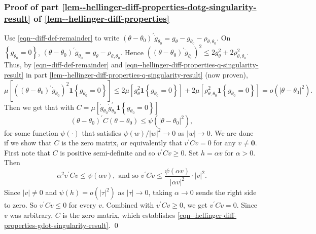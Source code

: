 \documentclass[12pt]{article}
\let\Cref\autoref
\theoremstyle{definition}
\theoremstyle{plain}
\begin{document}
\subsubsection{Proof of part
\ref{lem--hellinger-diff-properties-dotg-singularity-result}
of \Cref{lem--hellinger-diff-properties}}

Use \eqref{eqn--diff-def-remainder} to write
\((\theta - \theta_{0})^{\prime} \dot{g}_{\theta_{0}} = g_{\theta} -
g_{\theta_{0}} - \rho_{\theta, \theta_{0}}\).
On \(\left\{ g_{\theta_{0}} = 0 \right\}\), \((\theta - \theta_{0})^{\prime}
\dot{g}_{\theta_{0}} = g_{\theta} - \rho_{\theta, \theta_{0}}\).
Hence \(\left( (\theta - \theta_{0})^{\prime} \dot{g}_{\theta_{0}} \right)^{2}
\leq 2 g_{\theta}^{2} + 2 \rho_{\theta, \theta_{0}}^{2}\).
Thus, by \eqref{eqn--diff-def-remainder} and
\eqref{eqn--hellinger-diff-properties-q-singularity-result} in part
\ref{lem--hellinger-diff-properties-q-singularity-result} (now proven),
\begin{equation*}
  \mu \left[ \left( (\theta - \theta_{0})^{\prime} \dot{g}_{\theta_{0}}
  \right)^{2} \mathbf{1} \left\{ g_{\theta_{0}} = 0 \right\} \right] \leq 2 \mu
  \left[ g_{\theta}^{2} \mathbf{1} \left\{ g_{\theta_{0}} = 0 \right\} \right] +
  2 \mu \left[ \rho_{\theta, \theta_{0}}^{2} \mathbf{1} \left\{ g_{\theta_{0}} =
  0 \right\} \right] = o \left( |\theta - \theta_{0}|^{2} \right).
\end{equation*}
Then we get that with \(C = \mu \left[ \dot{g}_{\theta_{0}}
\dot{g}_{\theta_{0}}^{\prime} \mathbf{1} \left\{ g_{\theta_{0}} = 0 \right\}
\right]\)
\begin{equation*}
  (\theta - \theta_{0})^{\prime} C (\theta - \theta_{0}) \leq \psi \left(
  |\theta - \theta_{0}|^{2} \right),
\end{equation*}
for some function \(\psi (\cdot)\) that satisfies \(\psi (w) / |w|^{2} \to 0\)
as \(|w| \to 0\).
We are done if we show that \(C\) is the zero matrix, or equivalently that
\(v^{\prime} C v = 0\) for any \(v \neq \mathbf{0}\).
First note that \(C\) is positive semi-definite and so \(v^{\prime} C v \geq
0\).
Set \(h = \alpha v\) for \(\alpha > 0\).
Then
\begin{equation*}
  \alpha^{2} v^{\prime} C v \leq \psi(\alpha v), \text{ and so }
  v^{\prime} C v \leq \frac{\psi(\alpha v)}{|\alpha v|^{2}} \cdot |v|^{2}.
\end{equation*}
Since \(|v| \neq 0\) and \(\psi(h) = o(|\tau|^{2})\) as \(|\tau| \to 0\), taking
\(\alpha \to 0\) sends the right side to zero.
So \(v^{\prime}Cv \leq 0\) for every \(v\).
Combined with \(v^{\prime} C v \geq 0\), we get \(v^{\prime} C v = 0\).
Since \(v\) was arbitrary, \(C\) is the zero matrix, which establishes
\eqref{eqn--hellinger-diff-properties-gdot-singularity-result}.
\qed
\end{document}
